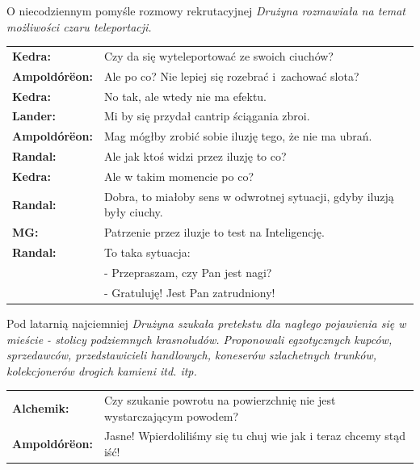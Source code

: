 \documentclass[10pt,twoside,twocolumn]{book}
\begin{document}
\begin{rpg-quotebox}{O niecodziennym pomyśle rozmowy rekrutacyjnej}
   \textit{Drużyna rozmawiała na temat możliwości czaru teleportacji.}\\

   \begin{tabularx}{\columnwidth}{lX}
      \textbf{Kedra:} & Czy da się wyteleportować ze swoich ciuchów?\\
      \textbf{Ampoldórëon:} & Ale po co? Nie lepiej się rozebrać i~zachować slota?\\
      \textbf{Kedra:} & No tak, ale wtedy nie ma efektu.\\
      \textbf{Lander:} & Mi by się przydał cantrip ściągania zbroi.\\
      \textbf{Ampoldórëon:} & Mag mógłby zrobić sobie iluzję tego, że nie ma ubrań.\\
      \textbf{Randal:} & Ale jak ktoś widzi przez iluzję to co?\\
      \textbf{Kedra:} & Ale w takim momencie po co?\\
      \textbf{Randal:} & Dobra, to miałoby sens w odwrotnej sytuacji, gdyby iluzją były ciuchy.\\
      \textbf{MG:} & Patrzenie przez iluzje to test na Inteligencję.\\
      \textbf{Randal:} & To taka sytuacja:\\
                       & - Przepraszam, czy Pan jest nagi?\\ 
                       & - Gratuluję! Jest Pan zatrudniony!\\
   \end{tabularx}
\end{rpg-quotebox}


\begin{rpg-quotebox}{Pod latarnią najciemniej}
   \textit{Drużyna szukała pretekstu dla nagłego pojawienia się w mieście - stolicy podziemnych krasnoludów. Proponowali egzotycznych kupców, sprzedawców, przedstawicieli handlowych, koneserów szlachetnych trunków, kolekcjonerów drogich kamieni itd. itp.}\\

   \begin{tabularx}{\columnwidth}{lX}
      \textbf{Alchemik:} & Czy szukanie powrotu na powierzchnię nie jest wystarczającym powodem?\\
      \textbf{Ampoldórëon:} & Jasne! Wpierdoliliśmy się tu chuj wie jak i teraz chcemy stąd iść!\\
   \end{tabularx}
\end{rpg-quotebox}
\end{document}
